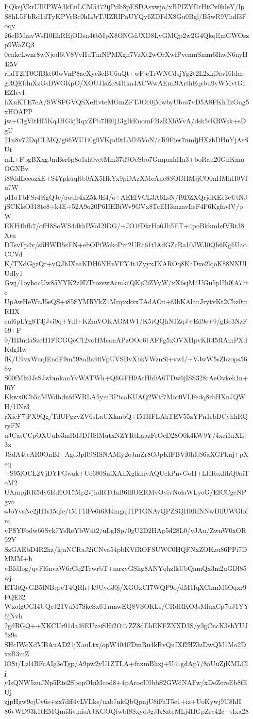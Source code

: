IjQkejVkrUIEPWA3kEnLCM5472ijPdb8pESDAsxwjo/xBPIZYf1rHtCv0hleY/Ip
S8hL5FbRd1dTyKPVrBc0hLJrTJIZRIPaUYQy6ZDFdX8Gu0Bgl/B5wR9Vhdf3Foqv
26eBMmvWsf10EkREjODsn4tbMpX8ONGdJXD8LvGMQp2w2G4QkqEmGWOszp9WaZQ3
0cnkcLwnr8wNjod6tV8VvHuTmNPMXgn7VzXt2wOrXwfPvcnmSmm6IhwN6nyH4i5V
rildT2iT0GfBkt60wVnP8aeXyc3eBU6uQt+wFjeTrWNCdsjYg2t2L2xkDavI6ldm
gRQEfdnXzGsDWGKpO/XOUJIsZc84Hka4ACWwAEml9ArthEqsbu9yWMvtGIEZIcvI
hXuKTE7cA/SWSFGVQSXeHvteMGmZFTJOr0jMwbyUbcs7vD5A8FKhTzGug5xHOAPP
jw+ClgVltHI5KqJHGkjRqxZPb7IE0j13gIkEnomFBzRXhWvA/dsk5sKRWsk+sDgU
21n8v72DqCLMQ/g66WU1i0g9VKpd9rLMb5VoN/aR9Fies7nmljHXzbDHuYjAsSUt
mL+FbgBXxgJmBsr6p8o1sh0vetMm37d9OeSbo7GmpmhHn3+boRau20GnKmuOGNBv
i88ddLecozxE+S4Ypkuqltb0AX5HkYx9pDAzXMcAnc8SODHMjjCO0nHMhH0Vfu7W
pI1oTbFSr49igQJc/awdr4xZ5kJE4/o+AEEfVCL3A6LsN/f9DZXQrjoKEe3cUtNJ
jSCKlsO318te8+k4E+52A9o20P6HEBiWv9GVx8TcEH3mzavIisF4F6KgfavlV/pW
EKH4hfb7/ofH8SoWS4dkhIWoU9DG/+JO1fDkrHo6Jb5ET+4poBkkmIefVRt38Xrn
DTsvFp4v/s5HWD5zEN+ebOPiWckoPm2URc61tIAdGZcRa10JWJ0Qh6Kg6UaoCCVd
K/TXdGgzQr+vQJhIXeaKDH6NHnVFY4t4ZyyxJKAROq8KaDxe2lqoK88NNUlUdIy1
Gwj/1oyhocUw85YYK2z9DTtozswAcmkcQKjCiZVyW/xX6sjM4UGu5pl2h0lA77rc
UpAwHeWnJ5eQS+i85SYMRYkZ1MrqtxkzxTAdAOn+f3bKAlanJrytvKt2Cbz0mRHX
enl6pLYg8T4jJvi9q+Ydl+KZmVOKAGMW1/K5rQQhN1ZqJ+Ed9s+9/gBc3NzF69+F
9/Hl3ndaSzeH1FfCGQeC12voHMcanAPzOOo61AFFg5xOVXHpvKR45RAmPXdKdgHw
fK/U9vxWuqfEudF9m598oBa9fiVpUVSBvXbkVWznSl+vwI/+VJwW5sZbzops566v
S00fMlz3JsSJwbmkanYvWATWh+Q6GFH9AtHh0A6TDw6jISS328rAeOvkek1n+I6Y
Kkwx0Cb5nMWdbdnfdWRLA5ymBPtcaKUAQ2Wtf7Mor0VLFedq8rbHXnJQWH/1lNr3
rXieF7jPX9Qg/TdUPgzvZV6sLaUXkmbQ+IM3IFLAkTEV55zYPn1rbDCyhhRQryFN
uJCasCCpOXUuIe3mRdJDfJSlMutxNZYRtLaazFcOeD28O0k4kW9Y/4xci1nXLj3x
JSdA4tcAR0OnBI+Agd3pR9SISNAMiy2oJmZr8OJpKfFBVf0hfeS6aXGPknj+pXeq
+S95lOCL2VjDYPGwak+Ue680SniXAhXglkmvAQUekPnvGoH+LHRsxlfhQ0aiToM2
UXmpjRR5dy6Rd6O15Mp2vjhdRTtluB6llIOERMvOvivNolaWLyoG/EICCgeNPgvo
sJoYvsNe2jH1s15qfe/tMT1iPe6t6M4mgqTIP1GNAvQPZSQH0RfNNwDifUWGlofm
vPSYFodw66Svk7YsReYbW4t2/uLgISp/0gU2D2HAp5d28L0/vJAu/ZwnW0xOR92Y
SzGAEbD4R2hz/kjaNCRaJ2iCNva54pbKVfROFSUWC0HQFNxZOKzu86PPi7DMMM+b
vBIdIog/qvFl6nvaW6rGq2TcwrbT+mrzyGShg8ANYqhzlkUbQamQx3m2uGDl85wj
ET3tQvGB5lNBrpeT4QRh+k9Uyd30j/XGOxCI7WQP9o/dM1fqXCkmM6Oqxr9FQE32
WxolgOGI4UQcJ21VuM7SkeSx6TmnwEQ8VSOKLs/CRdRKO3sMluxCp7uJ1YY6jNvh
2gdBGQ++XKCUr91da46EUzeiSHi2O47ZZ8dEhEKFZNXD3S/y3gCncK3sbYUJ5z9s
SHcIWcXdMBAuAD21jXauLtx/opW404FDmRu4kRvQnIXf2HZhiDwQM1Mo2DxzB3mZ
lOSt/Lzl4BFcAIg3eTgp/A9pw2yU1ZTLA+fnxmBhxj+U41gdAp7/8aUuZjKMLClj
yIsQNW5zuJNp5Rte2SbopObiMcod8+4pArocU0bbS2GWdNAFw/xDeZcreEb8fEUj
zjpHgw9ejUv6s+zx7dff4vLVLks/uab7nkQbQpnjU8iFaT5e1+iz+UoKywj9U8hH
86vWD93k1tEMQmi3ivmisAJKGOQfwbf8SxydJgJK8zteMLj4HGpZrc42e+sIxa28
